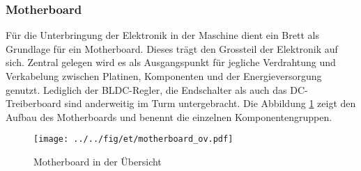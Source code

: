 \subsubsection{Motherboard}
Für die Unterbringung der Elektronik in der Maschine dient ein Brett
als Grundlage für ein Motherboard. Dieses trägt den Grossteil der
Elektronik auf sich. Zentral gelegen wird es als Ausgangspunkt für
jegliche Verdrahtung und Verkabelung zwischen Platinen, Komponenten und der
Energieversorgung genutzt. Lediglich der BLDC-Regler, die Endschalter 
als auch das DC-Treiberboard sind anderweitig im Turm untergebracht.
Die Abbildung \ref{fig:motherboard_pcb} zeigt den Aufbau des Motherboards
und benennt die einzelnen Komponentengruppen.


\begin{figure}[h!]
	\centering
	\texttt{[image: ../../fig/et/motherboard\_ov.pdf]}
	\caption{Motherboard in der Übersicht}
	\label{fig:motherboard_pcb}
\end{figure}

